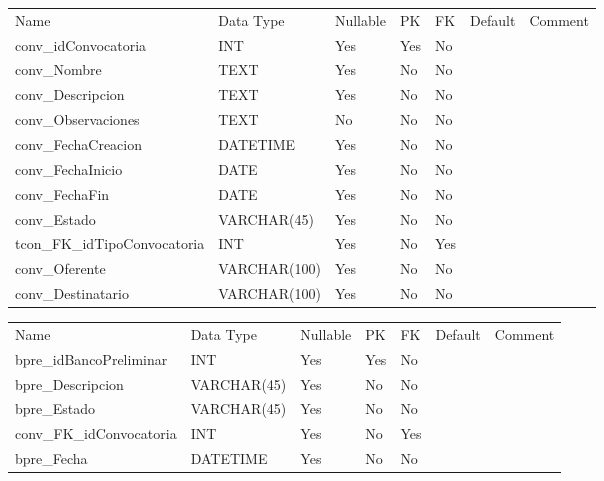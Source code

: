 			\begin{center}
				\begin{tabular}{ |l|l|l|l|l|l|l| }
					\hline
					Name & Data Type & Nullable & PK & FK & Default & Comment \\
					conv_idConvocatoria & INT & Yes & Yes & No &  & \\ \hline 
conv_Nombre & TEXT & Yes & No & No &  & \\ \hline 
conv_Descripcion & TEXT & Yes & No & No &  & \\ \hline 
conv_Observaciones & TEXT & No & No & No &  & \\ \hline 
conv_FechaCreacion & DATETIME & Yes & No & No &  & \\ \hline 
conv_FechaInicio & DATE & Yes & No & No &  & \\ \hline 
conv_FechaFin & DATE & Yes & No & No &  & \\ \hline 
conv_Estado & VARCHAR(45) & Yes & No & No &  & \\ \hline 
tcon_FK_idTipoConvocatoria & INT & Yes & No & Yes &  & \\ \hline 
conv_Oferente & VARCHAR(100) & Yes & No & No &  & \\ \hline 
conv_Destinatario & VARCHAR(100) & Yes & No & No &  & \\ \hline 

				\end{tabular}
			\end{center}
		

			\begin{center}
				\begin{tabular}{ |l|l|l|l|l|l|l| }
					\hline
					Name & Data Type & Nullable & PK & FK & Default & Comment \\
					bpre_idBancoPreliminar & INT & Yes & Yes & No &  & \\ \hline 
bpre_Descripcion & VARCHAR(45) & Yes & No & No &  & \\ \hline 
bpre_Estado & VARCHAR(45) & Yes & No & No &  & \\ \hline 
conv_FK_idConvocatoria & INT & Yes & No & Yes &  & \\ \hline 
bpre_Fecha & DATETIME & Yes & No & No &  & \\ \hline 

				\end{tabular}
			\end{center}
		

